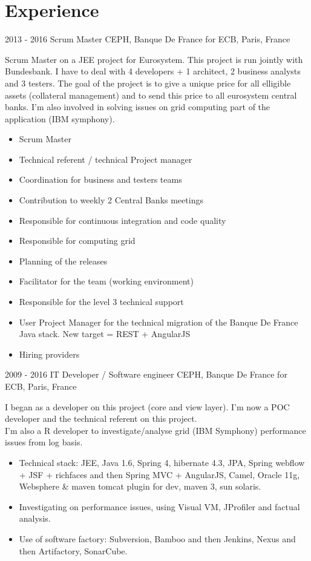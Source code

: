 \documentclass[]{bankcy}
\begin{document}
\section{Experience}
\begin{entrylist}
  \entry
    {2013 - 2016}
    {Scrum Master}
    {CEPH, Banque De France for ECB, Paris, France}
    {Scrum Master on a JEE project for Eurosystem. This project is run jointly with Bundesbank. I have to deal with 4 developers + 1 architect, 2 business analysts and 3 testers.
The goal of the project is to give a unique price for all elligible assets (collateral management) and to send this price to all eurosystem central banks. 
I'm also involved in solving issues on grid computing part of the application (IBM symphony).\\
\begin{itemize}
\item Scrum Master
\item Technical referent / technical Project manager
\item Coordination for business and testers teams
\item Contribution to weekly 2 Central Banks meetings
\item Responsible for continuous integration and code quality
\item Responsible for computing grid
\item Planning of the releases
\item Facilitator for the team (working environment)
\item Responsible for the level 3 technical support
\item User Project Manager for the technical migration of the Banque De France Java stack. New target = REST + AngularJS
\item Hiring providers
\end{itemize}
}
\entry
    {2009 - 2016}
    {IT Developer / Software engineer}
    {CEPH, Banque De France for ECB, Paris, France}
    {I began as a developer on this project (core and view layer). I'm now a POC developer and the technical referent on this project.\\
     I'm also a R developer to investigate/analyse grid (IBM Symphony) performance issues from log basis.\\
     \begin{itemize}
         \item Technical stack: JEE, Java 1.6, Spring 4, hibernate 4.3, JPA, Spring webflow + JSF + richfaces and then Spring MVC + AngularJS, Camel, Oracle 11g, Websphere \& maven tomcat plugin for dev, maven 3, sun solaris.
         \item Investigating on performance issues, using Visual VM, JProfiler and factual analysis.
         \item Use of software factory: Subversion, Bamboo and then Jenkins, Nexus and then Artifactory, SonarCube.
      \end{itemize}
}
\end{entrylist}
\end{document}
